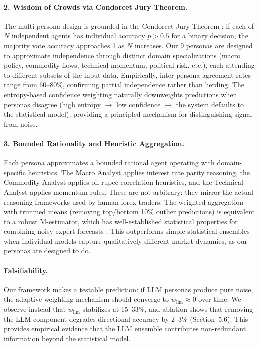 \documentclass[11pt]{article}
\begin{document}
\paragraph{2. Wisdom of Crowds via Condorcet Jury Theorem.}
The multi-persona design is grounded in the Condorcet Jury Theorem \citep{condorcet1785}: if each of $N$ independent agents has individual accuracy $p > 0.5$ for a binary decision, the majority vote accuracy approaches 1 as $N$ increases. Our 9 personas are designed to approximate independence through distinct domain specializations (macro policy, commodity flows, technical momentum, political risk, etc.), each attending to different subsets of the input data. Empirically, inter-persona agreement rates range from 60--80\%, confirming partial independence rather than herding. The entropy-based confidence weighting naturally downweights predictions when personas disagree (high entropy $\rightarrow$ low confidence $\rightarrow$ the system defaults to the statistical model), providing a principled mechanism for distinguishing signal from noise.

\paragraph{3. Bounded Rationality and Heuristic Aggregation.}
Each persona approximates a bounded rational agent \citep{simon1955} operating with domain-specific heuristics. The Macro Analyst applies interest rate parity reasoning, the Commodity Analyst applies oil-rupee correlation heuristics, and the Technical Analyst applies momentum rules. These are not arbitrary: they mirror the actual reasoning frameworks used by human forex traders. The weighted aggregation with trimmed means (removing top/bottom 10\% outlier predictions) is equivalent to a robust M-estimator, which has well-established statistical properties for combining noisy expert forecasts \citep{clemen1989}. This outperforms simple statistical ensembles when individual models capture qualitatively different market dynamics, as our personas are designed to do.

\paragraph{Falsifiability.}
Our framework makes a testable prediction: if LLM personas produce pure noise, the adaptive weighting mechanism should converge to $w_{\text{llm}} \approx 0$ over time. We observe instead that $w_{\text{llm}}$ stabilizes at 15--33\%, and ablation shows that removing the LLM component degrades directional accuracy by 2--3\% (Section~5.6). This provides empirical evidence that the LLM ensemble contributes non-redundant information beyond the statistical model.
\end{document}
